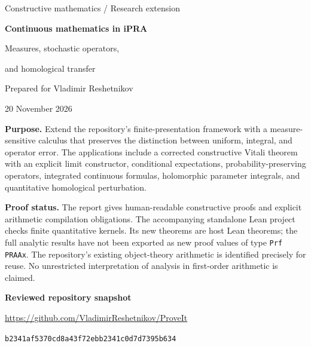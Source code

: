 \documentclass[11pt,a4paper]{article}
\newcommand{\pin}{\texttt{b2341af5370cd8a43f72ebb2341c0d7d7395b634}}
\theoremstyle{definition}
\theoremstyle{remark}
\begin{document}
\begin{titlepage}
\vspace*{14mm}
{\Large\color{MidnightBlue} Constructive mathematics / Research extension\par}
\vspace{14mm}
{\huge\bfseries Continuous mathematics in iPRA\par}
\vspace{6mm}
{\LARGE Measures, stochastic operators,\par and homological transfer\par}
\vspace{12mm}
{\large Prepared for Vladimir Reshetnikov\par}
{\large 20 November 2026\par}
\vspace{12mm}
\begin{minipage}{0.94\textwidth}
\textbf{Purpose.} Extend the repository's finite-presentation framework with a
measure-sensitive calculus that preserves the distinction between uniform,
integral, and operator error. The applications include a corrected constructive
Vitali theorem with an explicit limit constructor, conditional expectations,
probability-preserving operators, integrated continuous formulas, holomorphic
parameter integrals, and quantitative homological perturbation.

\medskip
\textbf{Proof status.} The report gives human-readable constructive proofs and
explicit arithmetic compilation obligations. The accompanying standalone Lean
project checks finite quantitative kernels. Its new theorems are host Lean
theorems; the full analytic results have not been exported as new proof values
of type \texttt{Prf PRAAx}. The repository's existing object-theory arithmetic
is identified precisely for reuse. No unrestricted interpretation of analysis
in first-order arithmetic is claimed.
\end{minipage}
\vfill
\textbf{Reviewed repository snapshot}\par
\smallskip
\url{https://github.com/VladimirReshetnikov/ProveIt}\par
\smallskip
{\small\pin\par}
\end{titlepage}
\end{document}
